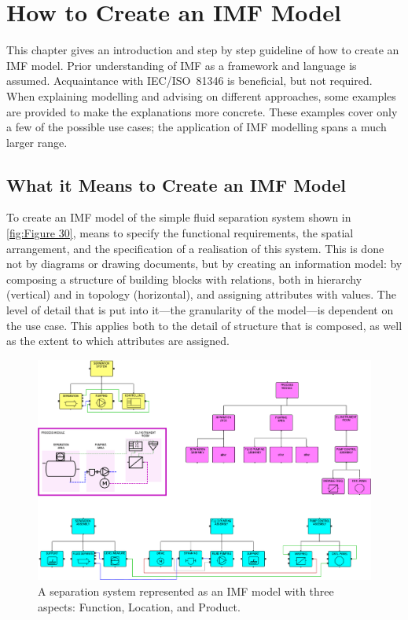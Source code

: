 \documentclass[../main.tex]{subfiles}
\begin{document}
\chapter{How to Create an IMF Model}
\label{ch:How to Create an IMF Model}
This chapter gives an introduction and
step by step guideline of how to create an IMF model. Prior understanding of IMF as a framework and language is
assumed. Acquaintance with IEC/ISO~81346 is beneficial, but not required. When explaining modelling and advising on
different approaches, some examples are provided to make the explanations more concrete. These examples cover only a
few of the possible use cases; the application of IMF modelling spans a much larger range.

\section{What it Means to Create an IMF Model}

To create an IMF model of the simple fluid separation system shown in \autoref{fig:Figure 30}, means
to specify the functional requirements, the spatial arrangement, and the
specification of a realisation of this system. This is done not by diagrams or drawing documents, but by
creating an information model: by composing a structure of building blocks with relations, both in hierarchy
(vertical) and in topology (horizontal), and assigning attributes with values. The level of detail that is put into it---the granularity of the model---is dependent
on the use case. This applies both to the detail of structure that is composed, as well as the extent to which
attributes are assigned.

\begin{figure}[htb]
  \includegraphics[width=1\textwidth]{img/IMFmanual-img049.png}
  \caption[A separation system represented as an IMF model.]{A separation system represented as an IMF model with
    three aspects: Function, Location, and Product.}
  \label{fig:Figure 30}
\end{figure}
\end{document}
